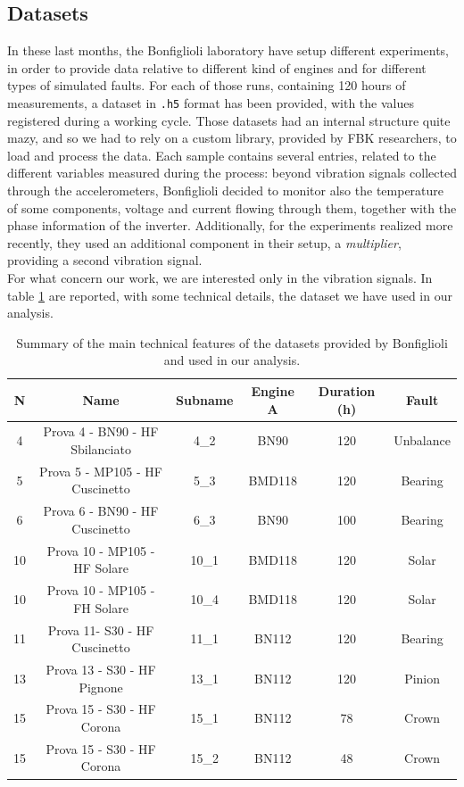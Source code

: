 \documentclass[../main.tex]{subfiles}
\begin{document}
\subsection{Datasets}

In these last months, the Bonfiglioli laboratory have setup different experiments, in order to provide data relative to different kind of engines and for different types of simulated faults. For each of those runs, containing 120 hours of measurements, a dataset in \texttt{.h5} format has been provided, with the values registered during a working cycle. Those datasets had an internal structure quite mazy, and so we had to rely on a custom library, provided by FBK researchers, to load and process the data. Each sample contains several entries, related to the different variables measured during the process: beyond vibration signals collected through the accelerometers, Bonfiglioli decided to monitor also the temperature of some components, voltage and current flowing through them, together with the phase information of the inverter. Additionally, for the experiments realized more recently, they used an additional component in their setup, a \textit{multiplier}, providing a second vibration signal.\\
For what concern our work, we are interested only in the vibration signals. In table \ref{tab:bonfiglioli_summary} are reported, with some technical details, the dataset we have used in our analysis.

\begin{table}[!ht]
	\centering
	\begin{tabular}{c c c c c c}
		\toprule
		\textbf{N} & \textbf{Name} & \textbf{Subname} & \textbf{Engine A} & \textbf{Duration (h)} & \textbf{Fault}\\
		\midrule
		4  & Prova 4 - BN90 - HF Sbilanciato & 4\_2  & BN90   & 120 & Unbalance \\
		5  & Prova 5 - MP105 - HF Cuscinetto & 5\_3  & BMD118 & 120 & Bearing   \\
		6  & Prova 6 - BN90 - HF Cuscinetto  & 6\_3  & BN90   & 100 & Bearing   \\
		10 & Prova 10 - MP105 - HF Solare    & 10\_1 & BMD118 & 120 & Solar 	\\
		10 & Prova 10 - MP105 - FH Solare    & 10\_4 & BMD118 & 120 & Solar 	\\
		11 & Prova 11- S30 - HF Cuscinetto   & 11\_1 & BN112  & 120 & Bearing 	\\
		13 & Prova 13 - S30 - HF Pignone     & 13\_1 & BN112  & 120 & Pinion    \\
		15 & Prova 15 - S30 - HF Corona      & 15\_1 & BN112  & 78  & Crown		\\
		15 & Prova 15 - S30 - HF Corona      & 15\_2 & BN112  & 48  & Crown		\\
		\bottomrule
	\end{tabular}
	\caption{Summary of the main technical features of the datasets provided by Bonfiglioli and used in our analysis.}
	\label{tab:bonfiglioli_summary}
\end{table}
\end{document}
